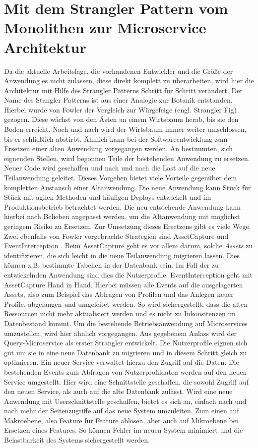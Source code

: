 \section{Mit dem Strangler Pattern vom Monolithen zur Microservice Architektur}
Da die aktuelle Arbeitslage, die vorhandenen Entwickler und die Größe der Anwendung es nicht zulassen, diese direkt komplett zu überarbeiten, wird hier die Architektur mit Hilfe des Strangler Patterns Schritt für Schritt verändert.
Der Name des Stangler Patterns ist aus einer Analogie zur Botanik entstanden. Hierbei wurde von Fowler \cite[][]{Fowler:Strangler} der Vergleich zur Würgefeige (engl. Strangler Fig) gezogen. Diese wächst von den Ästen an einem Wirtsbaum herab, bis sie den Boden erreicht. Nach und nach wird der Wirtsbaum immer weiter umschlossen, bis er schließlich abstirbt.
Ähnlich kann bei der Softwareentwicklung zum Ersetzen einer alten Anwendung vorgegangen werden. An bestimmten, sich eignenden Stellen, wird begonnen Teile der bestehenden Anwendung zu ersetzen. Neuer Code wird geschaffen und nach und nach die Last auf die neue Teilanwendung geleitet.
Dieses Vorgehen bietet viele Vorteile gegenüber dem kompletten Austausch einer Altanwendung. Die neue Anwendung kann Stück für Stück mit agilen Methoden und häufigen Deploys entwickelt und im Produktionsbetrieb betrachtet werden. Die neu entstehende Anwendung kann hierbei nach Belieben angepasst werden, um die Altanwendung mit möglichst geringem Risiko zu Ersetzen.
Zur Umsetzung dieses Ersetzens gibt es viele Wege. Zwei ebenfalls von Fowler vorgebrachte Strategien sind AssetCapture \cite[][]{Fowler:Capture} und EventInterception \cite[][]{Fowler:Interception}.
Beim AssetCapture geht es vor allem darum, solche \textit{Assets} zu identifizieren, die sich leicht in die neue Teilanwendung migrieren lassen. Dies können z.B. bestimmte Tabellen in der Datenbank sein. Im Fall der zu entwickelnden Anwendung sind dies die Nutzerprofile.
EventInterception geht mit AssetCapture Hand in Hand. Hierbei müssen alle Events auf die ausgelagerten Assets, also zum Beispiel das Abfragen von Profilen und das Anlegen neuer Profile, abgefangen und umgeleitet werden.
So wird sichergestellt, dass die alten Ressourcen nicht mehr aktualisiert werden und es nicht zu Inkonsitenzen im Datenbestand kommt.
Um die bestehende Betriebsanwendung auf Microservices umzustellen, wird hier ähnlich vorgegangen. Aus gegebenem Anlass wird der Query-Microservice als erster Strangler entwickelt. Die Nutzerprofile eignen sich gut um sie in eine neue Datenbank zu migrieren und in diesem Schritt gleich zu optimieren. Ein neuer Service verwaltet hierzu den Zugriff auf die Daten. Die bestehenden Events zum Abfragen von Nutzerprofildaten werden auf den neuen Service umgestellt. Hier wird eine Schnittstelle geschaffen, die sowohl Zugriff auf den neuen Service, als auch auf die alte Datenbank zulässt. Wird eine neue Anwendung mit Userschnittstelle geschaffen, bietet es sich an, einfach nach und nach mehr der Seitenzugriffe auf das neue System umzuleiten. Zum einen auf Makroebene, also Feature für Feature ablösen, aber auch auf Mikroebene bei Ersetzen eines Features. So können Fehler im neuen System minimiert und die Belastbarkeit des Systems sichergestellt werden.
